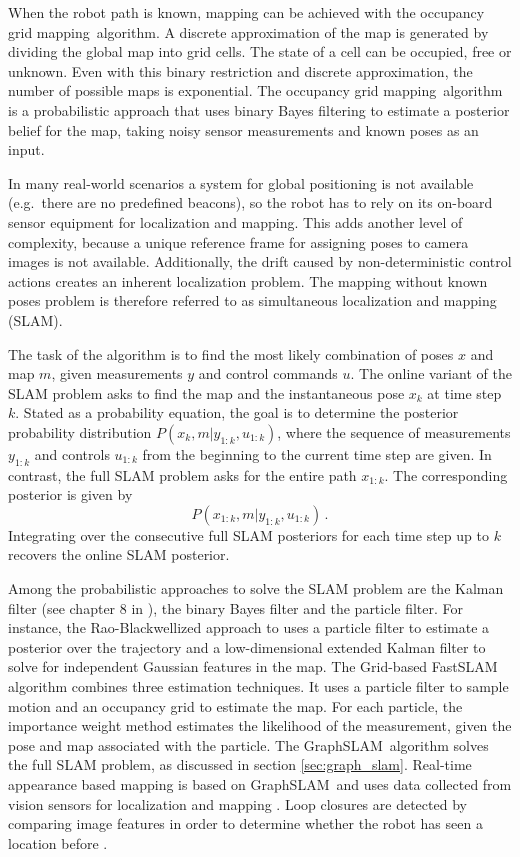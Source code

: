 \documentclass[10pt, journal, compsoc]{IEEEtran}
\newcommand{\gs}{GraphSLAM}
\newcommand{\ogm}{occupancy grid mapping}
\begin{document}
When the robot path is known, mapping can be achieved with the \ogm\ algorithm. A discrete approximation of the map is generated by dividing the global map into grid cells. The state of a cell can be occupied, free or unknown. Even with this binary restriction and discrete approximation, the number of possible maps is exponential. The \ogm\ algorithm is a probabilistic approach that uses binary Bayes filtering to estimate a posterior belief for the map, taking noisy sensor measurements and known poses as an input.

In many real-world scenarios a system for global positioning is not available  (e.g.\ there are no predefined beacons), so the robot has to rely on its on-board sensor equipment for localization and mapping. This adds another level of complexity, because a unique reference frame for assigning poses to camera images is not available. Additionally, the drift caused by non-deterministic control actions creates an inherent localization problem. The mapping without known poses problem is therefore referred to as simultaneous localization and mapping (SLAM).

The task of the algorithm is to find the most likely combination of poses $x$ and map $m$, given measurements $y$ and control commands $u$. The online variant of the SLAM problem asks to find the map and the instantaneous pose $x_k$ at time step $k$. Stated as a probability equation, the goal is to determine the posterior probability distribution $P \left(x_k ,m\vert y_{1:k}, u_{1:k} \right)$, where the sequence of measurements $y_{1:k}$ and controls $u_{1:k}$ from the beginning to the current time step are given. In contrast, the full SLAM problem asks for the entire path $x_{1:k}$. The corresponding posterior is given by
\begin{equation}
\label{eqn:posterior_full_slam}
P \left(x_{1:k} , m \vert y_{1:k}, u_{1:k}\right) \, .
\end{equation}
Integrating over the consecutive full SLAM posteriors for each time step up to $k$ recovers the online SLAM posterior.

Among the probabilistic approaches to solve the SLAM problem are the Kalman filter (see chapter $8$ in \cite{principles_of_robot_motion}), the binary Bayes filter and the particle filter. For instance, the Rao-Blackwellized approach to uses a particle filter to estimate a posterior over the trajectory and a low-dimensional extended Kalman filter to solve for independent Gaussian features in the map. The Grid-based FastSLAM algorithm combines three estimation techniques. It uses a particle filter to sample motion and an occupancy grid to estimate the map. For each particle, the importance weight method estimates the likelihood of the measurement, given the pose and map associated with the particle. The \gs\ algorithm solves the full SLAM problem, as discussed in section \ref{sec:graph_slam}. Real-time appearance based mapping is based on \gs\ and uses data collected from vision sensors for localization and mapping \cite{labbe14online}. Loop closures are detected by comparing image features in order to determine whether the robot has seen a location before \cite{labbe13appearance}.
\end{document}
